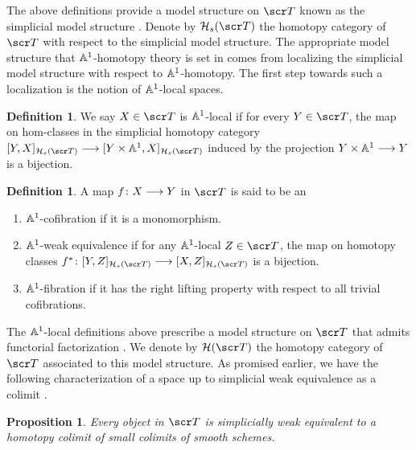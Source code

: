 \documentclass{amsart}
\newtheorem{prop}[thm]{Proposition}
\theoremstyle{definition}
\newtheorem{defn}[thm]{Definition}
\begin{document}
The above definitions provide a model structure on $\sT$ known as the simplicial model structure \cite[Corollary 2.7]{Jardine87simppr}. Denote by $\oH_s(\sT)$ the homotopy category of $\sT$ with respect to the simplicial model structure. The appropriate model structure that $\mathbb{A}^1$-homotopy theory is set in comes from localizing the simplicial model structure with respect to $\mathbb{A}^1$-homotopy. The first step towards such a localization is the notion of $\mathbb{A}^1$-local spaces.

\begin{defn}
We say $X \in \sT$ is $\mathbb{A}^1$-local if for every $Y \in \sT$, the map on hom-classes in the simplicial homotopy category $[Y,X]_{\oH_s(\sT)} \rtarr [Y \times \bA^1, X]_{\oH_s(\sT)}$ induced by the projection $Y \times \mathbb{A}^1 \longrightarrow Y$ is a bijection.
\end{defn}

\begin{defn}
A map $f \colon X \longrightarrow Y$ in $\sT$ is said to be an
\begin{enumerate}
\item $\mathbb{A}^1$-cofibration if it is a monomorphism.
\item $\mathbb{A}^1$-weak equivalence if for any $\mathbb{A}^1$-local $Z \in \sT$, the map on homotopy classes $f^* \colon [Y,Z]_{\oH_s (\sT)} \rtarr [X,Z]_{\oH_s(\sT)}$ is a bijection.
\item $\mathbb{A}^1$-fibration if it has the right lifting property with respect to all trivial cofibrations.
\end{enumerate}
\end{defn}

The $\mathbb{A}^1$-local definitions above prescribe a model structure on $\sT$ that admits functorial factorization \cites[Theorem 2.21]{MV99}[Section 2]{Jardine87simppr}. 
We denote by $\oH (\sT)$ the homotopy category of $\sT$ associated to this model structure.
As promised earlier, we have the following characterization of a space up to simplicial weak equivalence as a colimit \cite[Lemma 17.3]{Hu03}. 
\begin{prop}\label{prop:1.5}
Every object in $\sT$ is simplicially weak equivalent to a homotopy colimit of small colimits of smooth schemes. 
\end{prop}
\end{document}
